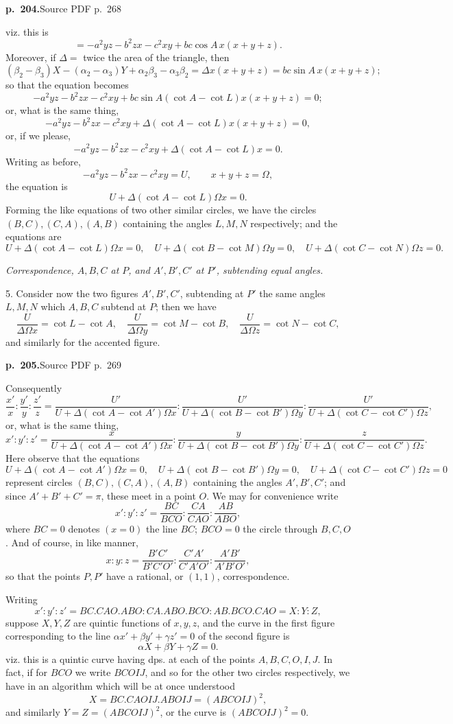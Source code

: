 \documentclass[11pt,a4paper]{article}
\newcommand{\sourcepage}[2]{\par\bigskip\noindent\textbf{p.~#1.}\hfill{\footnotesize Source PDF p.~#2}\par\nobreak\medskip}
\newcommand{\dps}{dps.}
\begin{document}
\sourcepage{204}{268}
viz. this is
\[
=-a^2yz-b^2zx-c^2xy+bc\cos A\,x(x+y+z).
\]
Moreover, if $\Delta=$ twice the area of the triangle, then
\[
(\beta_2-\beta_3)X-(\alpha_2-\alpha_3)Y+\alpha_2\beta_3-\alpha_3\beta_2
=\Delta x(x+y+z)=bc\sin A\,x(x+y+z);
\]
so that the equation becomes
\[
-a^2yz-b^2zx-c^2xy+bc\sin A(\cot A-\cot L)x(x+y+z)=0;
\]
or, what is the same thing,
\[
-a^2yz-b^2zx-c^2xy+\Delta(\cot A-\cot L)x(x+y+z)=0,
\]
or, if we please,
\[
-a^2yz-b^2zx-c^2xy+\Delta(\cot A-\cot L)x=0.
\]
Writing as before,
\[
-a^2yz-b^2zx-c^2xy=U,\qquad x+y+z=\Omega,
\]
the equation is
\[
U+\Delta(\cot A-\cot L)\Omega x=0.
\]
Forming the like equations of two other similar circles, we have the circles $(B,C),(C,A),(A,B)$ containing the angles $L,M,N$ respectively; and the equations are
\[
U+\Delta(\cot A-\cot L)\Omega x=0,\quad
U+\Delta(\cot B-\cot M)\Omega y=0,\quad
U+\Delta(\cot C-\cot N)\Omega z=0.
\]

\begin{center}\textit{Correspondence, $A,B,C$ at $P$, and $A',B',C'$ at $P'$, subtending equal angles.}\end{center}

5. Consider now the two figures $A',B',C'$, subtending at $P'$ the same angles $L,M,N$ which $A,B,C$ subtend at $P$; then we have
\[
\frac{U}{\Delta\Omega x}=\cot L-\cot A,\quad
\frac{U}{\Delta\Omega y}=\cot M-\cot B,\quad
\frac{U}{\Delta\Omega z}=\cot N-\cot C,
\]
and similarly for the accented figure.

\sourcepage{205}{269}
Consequently
\[
\frac{x'}{x}:\frac{y'}{y}:\frac{z'}{z}
=\frac{U'}{U+\Delta(\cot A-\cot A')\Omega x}:
\frac{U'}{U+\Delta(\cot B-\cot B')\Omega y}:
\frac{U'}{U+\Delta(\cot C-\cot C')\Omega z},
\]
or, what is the same thing,
\[
x':y':z'=
\frac{x}{U+\Delta(\cot A-\cot A')\Omega x}:
\frac{y}{U+\Delta(\cot B-\cot B')\Omega y}:
\frac{z}{U+\Delta(\cot C-\cot C')\Omega z}.
\]
Here observe that the equations
\[
U+\Delta(\cot A-\cot A')\Omega x=0,\quad
U+\Delta(\cot B-\cot B')\Omega y=0,\quad
U+\Delta(\cot C-\cot C')\Omega z=0
\]
represent circles $(B,C),(C,A),(A,B)$ containing the angles $A',B',C'$; and since $A'+B'+C'=\pi$, these meet in a point $O$. We may for convenience write
\[
x':y':z'=\frac{BC}{BCO}:\frac{CA}{CAO}:\frac{AB}{ABO},
\]
where $BC=0$ denotes $(x=0)$ the line $BC$; $BCO=0$ the circle through $B,C,O$. And of course, in like manner,
\[
x:y:z=\frac{B'C'}{B'C'O'}:\frac{C'A'}{C'A'O'}:\frac{A'B'}{A'B'O'},
\]
so that the points $P,P'$ have a rational, or $(1,1)$, correspondence.

Writing
\[
x':y':z'=BC.CAO.ABO:CA.ABO.BCO:AB.BCO.CAO=X:Y:Z,
\]
suppose $X,Y,Z$ are quintic functions of $x,y,z$, and the curve in the first figure corresponding to the line $\alpha x'+\beta y'+\gamma z'=0$ of the second figure is
\[
\alpha X+\beta Y+\gamma Z=0.
\]
viz. this is a quintic curve having \dps{} at each of the points $A,B,C,O,I,J$. In fact, if for $BCO$ we write $BCOIJ$, and so for the other two circles respectively, we have in an algorithm which will be at once understood
\[
X=BC.CAOIJ.ABOIJ=(ABCOIJ)^2,
\]
and similarly $Y=Z=(ABCOIJ)^2$, or the curve is $(ABCOIJ)^2=0$.
\end{document}
